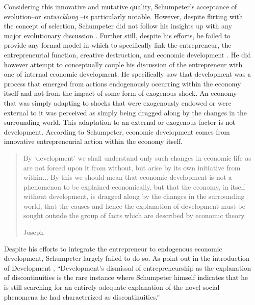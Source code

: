Considering this innovative and mutative quality, Schumpeter's acceptance of evolution--or \emph{entwicklung} \citep{Schumpeter2005}--is particularly notable. However, despite flirting with the concept of selection, Schumpeter did not follow his insights up with any major evolutionary discussion \citep{SmelsterSwedberg2005}. Further still, despite his efforts, he failed to provide any formal model in which to specifically link the entrepreneur, the entrepreneurial function, creative destruction, and economic development \citep{Witt2002}. He did however attempt to conceptually couple his discussion of the entrepreneur with one of internal economic development. He specifically saw that development was a process that emerged from actions endogenously occurring within the economy itself and not from the impact of some form of exogenous shock. An economy that was simply adapting to shocks that were exogenously endowed or were external to it was perceived as simply being dragged along by the changes in the surrounding world. This adaptation to an external or exogenous factor is not development. According to Schumpeter, economic development comes from innovative entrepreneurial action within the economy itself.
\begin{quote}
By `development' we shall understand only such changes in economic life as are not forced upon it from without, but arise by its own initiative from within... By this we should mean that economic development is not a phenomenon to be explained economically, but that the economy, in itself without development, is dragged along by the changes in the surrounding world, that the causes and hence the explanation of development must be sought outside the group of facts which are described by economic theory.

\begin{flushright}
Joseph \citet[p.~63]{Schumpeter1934}
\end{flushright}
\end{quote}
Despite his efforts to integrate the entrepreneur to endogenous economic development, Schumpeter largely failed to do so. As \citet{Becker2006} point out in the introduction of Development \citet[p.~111]{Schumpeter2005}, ``Development's dismissal of entrepreneurship as the explanation of discontinuities is the rare instance where Schumpeter himself indicates that he is still searching for an entirely adequate explanation of the novel social phenomena he had characterized as discontinuities.''

